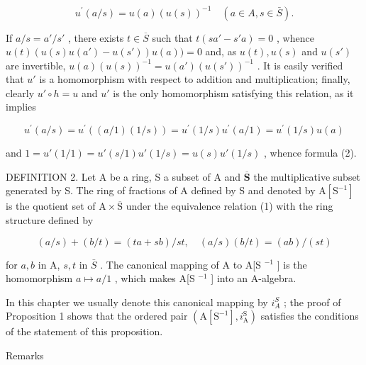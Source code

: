 \[
u ^ {\prime} (a / s) = u (a) (u (s)) ^ {- 1} \quad (a \in A, s \in \bar {S}).\tag{2}
\]

If \(a / s = a' / s'\) , there exists \(t \in \overline{S}\) such that \(t(sa' - s'a) = 0\) , whence \(u(t)(u(s)u(a') - u(s'))u(a)) = 0\) and, as \(u(t), u(s)\) and \(u(s')\) are invertible, \(u(a)(u(s))^{-1} = u(a')(u(s'))^{-1}\) . It is easily verified that \(u'\) is a homomorphism with respect to addition and multiplication; finally, clearly \(u' \circ h = u\) and \(u'\) is the only homomorphism satisfying this relation, as it implies

\[
u ^ {\prime} (a / s) = u ^ {\prime} ((a / 1) (1 / s)) = u ^ {\prime} (1 / s) u ^ {\prime} (a / 1) = u ^ {\prime} (1 / s) u (a)
\]

and \(1 = u'(1/1) = u'(s/1)u'(1/s) = u(s)u'(1/s)\) , whence formula (2).

DEFINITION 2. Let A be a ring, S a subset of A and \(\overline{\mathbf{S}}\) the multiplicative subset generated by S. The ring of fractions of A defined by S and denoted by \(\mathrm{A}[\mathrm{S}^{-1}]\) is the quotient set of \(\mathrm{A} \times \overline{\mathrm{S}}\) under the equivalence relation (1) with the ring structure defined by

\[
(a / s) + (b / t) = (t a + s b) / s t, \quad (a / s) (b / t) = (a b) / (s t)
\]

for \(a, b\) in A, \(s, t\) in \(\bar{S}\) . The canonical mapping of A to A{[}S \(^{-1}\) {]} is the homomorphism \(a \mapsto a/1\) , which makes A{[}S \(^{-1}\) {]} into an A-algebra.

In this chapter we usually denote this canonical mapping by \(i_{A}^{S}\) ; the proof of Proposition 1 shows that the ordered pair \((\mathrm{A}[\mathrm{S}^{-1}], i_{\mathrm{A}}^{\mathrm{S}})\) satisfies the conditions of the statement of this proposition.

Remarks

